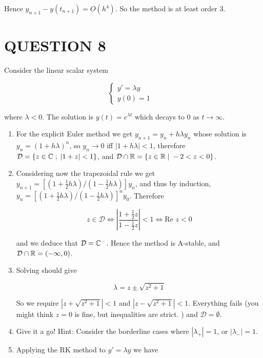 \documentclass[a4paper]{article}
\begin{document}
Hence $ y_{n+1} - y(t_{n+1}) = O(h^{4}) $. So the method is at least order 3.


\section{QUESTION 8}

Consider the linear scalar system 

\[ \begin{cases} y' = \lambda y  & \\ y(0) = 1&  \end{cases} \]

where $ \lambda < 0 $. The solution is $ y(t) = e^{\lambda t} $ which decays to $ 0 $ as $ t \to \infty $. 

\begin{enumerate}
	\item For the explicit Euler method we get $ y_{n+1} = y_{n} + h \lambda y_{n} $ whose solution is $ y_{n} = (1+ h \lambda)^{n} $, so $ y_{n} \to 0 $ iff $ | 1 + h \lambda | < 1 $, therefore $ \mathcal{D} = \{ z \in \mathbb{C} \; ; \; | 1 + z | < 1  \} $, and $ \mathcal{D} \cap \mathbb{R} = \{  z \in \mathbb{R}\; | \; -2 < z < 0 \} $.
	
	\item Considering now the trapezoidal rule we get $ y_{n+1} = [  (1+\frac{1}{2} h \lambda) / (1 - \frac{1}{2} h \lambda) ] y_{n} $, and thus by induction, $ y_{n} = [  (1+\frac{1}{2} h \lambda) / (1 - \frac{1}{2} h \lambda) ]^{n} y_{0} $. Therefore
	
	\[ z \in \mathcal{D} \iff \left| \frac{1+\frac{1}{2}z}{1 - \frac{1}{2} z} \right| < 1 \iff \text{Re } z < 0  \]
	
	and we deduce that $ \mathcal{D} = \mathbb{C}^{-} $. Hence the method is A-stable, and $ \mathcal{D} \cap \mathbb{R} = (-\infty,0) $. 
	
	\item Solving should give
	
	\[ \lambda = z \pm \sqrt{z^{2} + 1} \]
	
	
	So we require $ |z + \sqrt{z^{2} + 1} | < 1 $ and $ | z - \sqrt{z^{2} + 1} |   < 1 $. Everything fails (you might think $ z = 0 $ is fine, but inequalities are strict.  ) and $ \mathcal{D} = \emptyset $.
	
	\item Give it a go! Hint: Consider the borderline cases where $ | \lambda_{+} | = 1 $, or $ | \lambda_{-} | = 1 $.
	
	\item Applying the RK method to $ y' = \lambda y $ we have
	

\end{enumerate}
\end{document}
